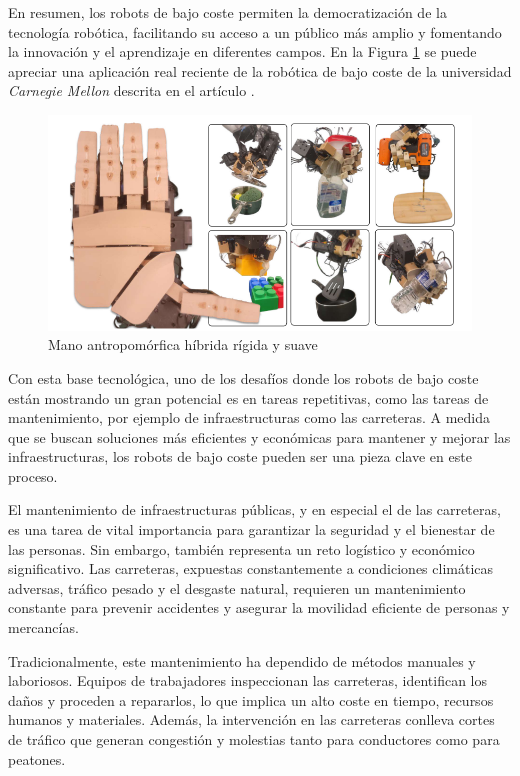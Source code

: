 En resumen, los robots de bajo coste permiten la democratización de la tecnología robótica, facilitando su acceso a un público más amplio y fomentando la innovación y el aprendizaje en diferentes campos. En la Figura \ref{fig:roblowcost} se puede apreciar una aplicación real reciente de la robótica de bajo coste de la universidad \textit{Carnegie Mellon} descrita en el artículo \cite{shaw2024leap}.

\begin{figure} [h!]
	\begin{center}
		\includegraphics[width=16cm]{figs/handlowcost.png}
	\end{center}
	\caption{Mano antropomórfica híbrida rígida y suave} %
	\label{fig:roblowcost}
\end{figure}

Con esta base tecnológica, uno de los desafíos donde los robots de bajo coste están mostrando un gran potencial es en tareas repetitivas, como las tareas de mantenimiento, por ejemplo de infraestructuras como las carreteras. A medida que se buscan soluciones más eficientes y económicas para mantener y mejorar las infraestructuras, los robots de bajo coste pueden ser una pieza clave en este proceso.

El mantenimiento de infraestructuras públicas, y en especial el de las carreteras, es una tarea de vital importancia para garantizar la seguridad y el bienestar de las personas. Sin embargo, también representa un reto logístico y económico significativo. Las carreteras, expuestas constantemente a condiciones climáticas adversas, tráfico pesado y el desgaste natural, requieren un mantenimiento constante para prevenir accidentes y asegurar la movilidad eficiente de personas y mercancías.

Tradicionalmente, este mantenimiento ha dependido de métodos manuales y laboriosos. Equipos de trabajadores inspeccionan las carreteras, identifican los daños y proceden a repararlos, lo que implica un alto coste en tiempo, recursos humanos y materiales. Además, la intervención en las carreteras conlleva cortes de tráfico que generan congestión y molestias tanto para conductores como para peatones.

